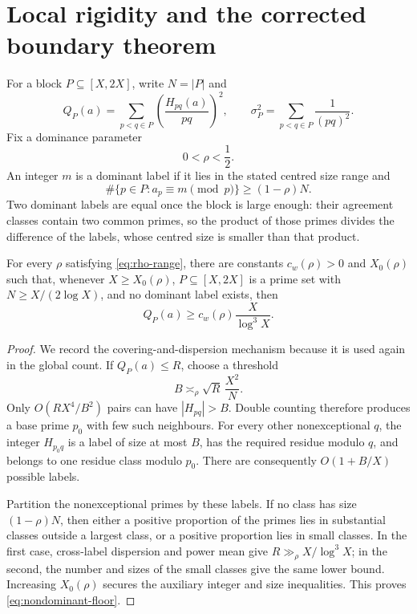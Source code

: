 \section{Local rigidity and the corrected boundary theorem}\label{sec:cold}

For a block $P\subseteq[X,2X]$, write $N=|P|$ and
\[
 Q_P(a)=\sum_{p<q\in P}\left(\frac{H_{pq}(a)}{pq}\right)^2,
 \qquad
 \sigma_P^2=\sum_{p<q\in P}\frac1{(pq)^2}.
\]
Fix a dominance parameter
\begin{equation}\label{eq:rho-range}
 0<\rho<\frac12.
\end{equation}
An integer $m$ is a dominant label if it lies in the stated centred size range
and
\begin{equation}\label{eq:dominant}
 \#\{p\in P:a_p\equiv m\pmod p\}\ge(1-\rho)N.
\end{equation}
Two dominant labels are equal once the block is large enough: their agreement
classes contain two common primes, so the product of those primes divides the
difference of the labels, whose centred size is smaller than that product.

\begin{proposition}\label{prop:nondominant}
For every $\rho$ satisfying \eqref{eq:rho-range}, there are constants
$c_w(\rho)>0$ and $X_0(\rho)$ such that, whenever $X\ge X_0(\rho)$,
$P\subseteq[X,2X]$ is a prime set with $N\ge X/(2\log X)$, and no dominant label
exists, then
\begin{equation}\label{eq:nondominant-floor}
 Q_P(a)\ge c_w(\rho)\frac{X}{\log^3X}.
\end{equation}
\end{proposition}
\begin{proof}
We record the covering-and-dispersion mechanism because it is used again in the
global count.  If $Q_P(a)\le R$, choose a threshold
\[
 B\asymp_\rho \sqrt R\,\frac{X^2}{N}.
\]
Only $O(RX^4/B^2)$ pairs can have $|H_{pq}|>B$.  Double counting therefore
produces a base prime $p_0$ with few such neighbours.  For every other
nonexceptional $q$, the integer $H_{p_0q}$ is a label of size at most $B$, has
the required residue modulo $q$, and belongs to one residue class modulo $p_0$.
There are consequently $O(1+B/X)$ possible labels.

Partition the nonexceptional primes by these labels.  If no class has size
$(1-\rho)N$, then either a positive proportion of the primes lies in substantial
classes outside a largest class, or a positive proportion lies in small
classes.  In the first case, cross-label dispersion and power mean give
$R\gg_\rho X/\log^3X$; in the second, the number and sizes of the small classes
give the same lower bound.  Increasing $X_0(\rho)$ secures the auxiliary
integer and size inequalities.  This proves \eqref{eq:nondominant-floor}.
\end{proof}

